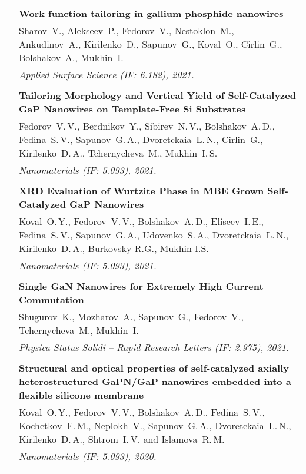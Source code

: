 \documentclass[letterpaper, 11pt]{article}
\begin{document}
\begin{longtable}{p{1.3in}p{4.8in}}
        & \textbf{Work function tailoring in gallium phosphide nanowires} \\
        & Sharov~V., Alekseev~P., Fedorov~V., Nestoklon~M., Ankudinov~A.,
        Kirilenko~D., Sapunov~G., Koval~O., Cirlin~G., Bolshakov~A., Mukhin~I.
        \\
        & \textit{Applied Surface Science (IF: 6.182), 2021.}\\
		& \\

        & \textbf{Tailoring Morphology and Vertical Yield of Self-Catalyzed GaP
        Nanowires on Template-Free Si Substrates} \\
        & Fedorov~V.\,V., Berdnikov~Y., Sibirev~N.\,V., Bolshakov~A.\,D.,
        Fedina~S.\,V., Sapunov~G.\,A., Dvoretckaia~L.\,N., Cirlin~G.,
        Kirilenko~D.\,A., Tchernycheva~M., Mukhin~I.\,S. \\
		& \textit{Nanomaterials (IF: 5.093), 2021.}\\
		& \\

        & \textbf{XRD Evaluation of Wurtzite Phase in MBE Grown Self-Catalyzed
        GaP Nanowires} \\
        & Koval~O.\,Y., Fedorov~V.\,V., Bolshakov~A.\,D., Eliseev~I.\,E.,
        Fedina~S.\,V., Sapunov~G.\,A., Udovenko~S.\,A., Dvoretckaia~L.\,N.,
        Kirilenko~D.\,A., Burkovsky R.G., Mukhin I.S. \\
        & \textit{Nanomaterials (IF: 5.093), 2021.}\\
		& \\

        & \textbf{Single GaN Nanowires for Extremely High Current Commutation}
        \\
        & Shugurov~K., Mozharov~A., Sapunov~G., Fedorov~V., Tchernycheva~M.,
        Mukhin~I. \\
        & \textit{Physica Status Solidi -- Rapid Research Letters (IF: 2.975), 2021.}\\
		& \\

        & \textbf{Structural and optical properties of self-catalyzed axially
        heterostructured GaPN/GaP nanowires embedded into a flexible silicone
        membrane} \\
        & Koval~O.\,Y., Fedorov~V.\,V., Bolshakov~A.\,D., Fedina~S.\,V.,
        Kochetkov~F.\,M., Neplokh~V., Sapunov~G.\,A., Dvoretckaia~L.\,N.,
        Kirilenko~D.\,A., Shtrom~I.\,V. and Islamova~R.\,M. \\
        & \textit{Nanomaterials (IF: 5.093), 2020.}\\
		& \\
		

\end{longtable}
\end{document}
